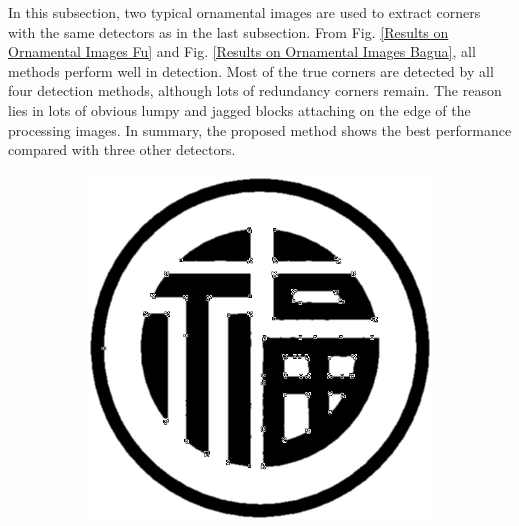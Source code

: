 \documentclass[letterpaper, 10 pt, conference]{ieeeconf}  %
\begin{document}
In this subsection, two typical ornamental images are used to extract corners with the same detectors as in the last subsection. From Fig. \ref{Results on Ornamental Images Fu} and Fig. \ref{Results on Ornamental Images Bagua}, all methods perform well in detection. Most of the true corners are detected by all four detection methods, although lots of redundancy corners remain. The reason lies in lots of obvious lumpy and jagged blocks attaching on the edge of the processing images. In summary, the proposed method shows the best performance compared with three other detectors.
\begin{figure}[htbp]
	  	\centering
   	\begin{subfigure}[b]{0.49\linewidth}
    	\includegraphics[width=\linewidth]{experiments/fu_harris.png}
    	\caption{}
   	\end{subfigure}
  	     \begin{subfigure}[b]{0.49\linewidth}

\end{subfigure}
\end{figure}
\end{document}
